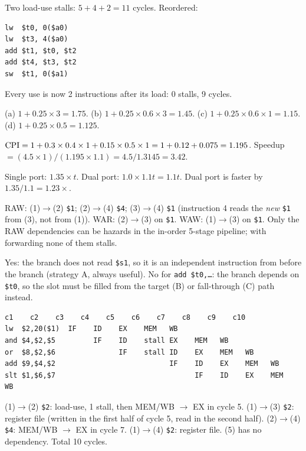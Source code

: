 \documentclass[11pt]{article}
\begin{document}
\begin{solution}[\ref{p:sched}]
Two load-use stalls: $5+4+2 = 11$ cycles. Reordered:
\begin{lstlisting}
lw  $t0, 0($a0)
lw  $t3, 4($a0)
add $t1, $t0, $t2
add $t4, $t3, $t2
sw  $t1, 0($a1)
\end{lstlisting}
Every use is now 2 instructions after its load: 0 stalls, 9 cycles.
\end{solution}

\begin{solution}[\ref{p:branch}]
(a) $1+0.25\times3 = 1.75$.
(b) $1+0.25\times0.6\times3 = 1.45$.
(c) $1+0.25\times0.6\times1 = 1.15$.
(d) $1+0.25\times0.5 = 1.125$.
\end{solution}

\begin{solution}[\ref{p:mix}]
$\mathrm{CPI} = 1+0.3\times0.4\times1+0.15\times0.5\times1 = 1+0.12+0.075 = 1.195$.
Speedup $=(4.5\times1)/(1.195\times1.1) = 4.5/1.3145 = 3.42$.
\end{solution}

\begin{solution}[\ref{p:struct}]
Single port: $1.35\times t$. Dual port: $1.0\times1.1t = 1.1t$. Dual port is
faster by $1.35/1.1 = 1.23\times$.
\end{solution}

\begin{solution}[\ref{p:classify}]
RAW: (1)$\to$(2) \texttt{\$1}; (2)$\to$(4) \texttt{\$4}; (3)$\to$(4)
\texttt{\$1} (instruction 4 reads the \emph{new} \texttt{\$1} from (3), not
from (1)). WAR: (2)$\to$(3) on \texttt{\$1}. WAW: (1)$\to$(3) on
\texttt{\$1}. Only the RAW dependencies can be hazards in the in-order
5-stage pipeline; with forwarding none of them stalls.
\end{solution}

\begin{solution}[\ref{p:slot}]
Yes: the branch does not read \texttt{\$s1}, so it is an independent
instruction from before the branch (strategy A, always useful). No for
\texttt{add \$t0,\dots}: the branch depends on \texttt{\$t0}, so the slot
must be filled from the target (B) or fall-through (C) path instead.
\end{solution}

\begin{solution}[\ref{p:draw}]
\begin{lstlisting}[basicstyle=\ttfamily\footnotesize,keywords={}]
               c1    c2    c3    c4    c5    c6    c7    c8    c9    c10
lw  $2,20($1)  IF    ID    EX    MEM   WB
and $4,$2,$5         IF    ID    stall EX    MEM   WB
or  $8,$2,$6               IF    stall ID    EX    MEM   WB
add $9,$4,$2                           IF    ID    EX    MEM   WB
slt $1,$6,$7                                 IF    ID    EX    MEM   WB
\end{lstlisting}
(1)$\to$(2) \texttt{\$2}: load-use, 1 stall, then MEM/WB $\to$ EX in
cycle 5. (1)$\to$(3) \texttt{\$2}: register file (written in the first half
of cycle 5, read in the second half). (2)$\to$(4) \texttt{\$4}: MEM/WB $\to$
EX in cycle 7. (1)$\to$(4) \texttt{\$2}: register file. (5) has no
dependency. Total 10 cycles.
\end{solution}
\end{document}
